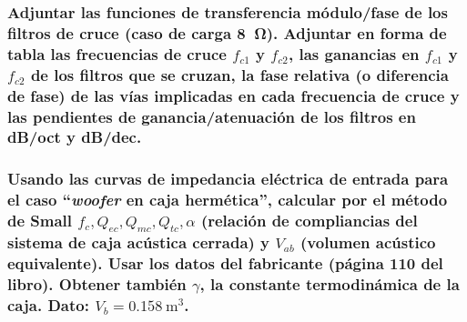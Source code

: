 \documentclass[10pt]{article}
\begin{document}
\subsubsection{Adjuntar las funciones de transferencia módulo/fase de los filtros de cruce (caso de carga \qty{8}{\ohm}). Adjuntar en forma de tabla las frecuencias de cruce $f_{c1}$ y $f_{c2}$, las ganancias en $f_{c1}$ y $f_{c2}$ de los filtros que se cruzan, la fase relativa (o diferencia de fase) de las vías implicadas en cada frecuencia de cruce y las pendientes de ganancia/atenuación de los filtros en dB/oct y dB/dec.}

\subsubsection{Usando las curvas de impedancia eléctrica de entrada para el caso ``\textit{woofer} en caja hermética'', calcular por el método de Small $f_c, Q_{ec}, Q_{mc}, Q_{tc}, \alpha$ (relación de compliancias del sistema de caja acústica cerrada) y $V_{ab}$ (volumen acústico equivalente). Usar los datos del fabricante (página 110 del libro). Obtener también $\gamma$, la constante termodinámica de la caja. Dato: $V_b = \qty{0.158}{\metre\cubed}$.}
\end{document}
